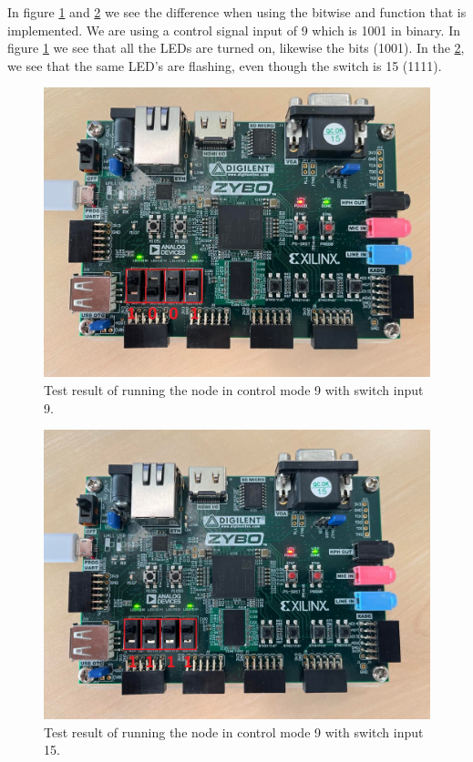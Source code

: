\documentclass[a4paper,12pt]{report}    %
\begin{document}
In figure \ref{FIG::27::MODE2} and \ref{FIG::27::MODE3} we see the difference when using the bitwise and function that is implemented. We are using a control signal input of 9 which is 1001 in binary. In figure \ref{FIG::27::MODE2} we see that all the LEDs are turned on, likewise the bits (1001). In the \ref{FIG::27::MODE3}, we see that the same LED's are flashing, even though the switch is 15 (1111).

\begin{figure}[H]
  \centering
  \includegraphics[width=\linewidth]{latex/figures/ass2_27_1001_0.jpg}
  \caption{Test result of running the node in control mode 9 with switch input 9.}
  \label{FIG::27::MODE2}
\end{figure}

\begin{figure}[H]
  \centering
  \includegraphics[width=\linewidth]{latex/figures/ass2_27_1001_1.jpg}
  \caption{Test result of running the node in control mode 9 with switch input 15.}
  \label{FIG::27::MODE3}
\end{figure}
\end{document}
